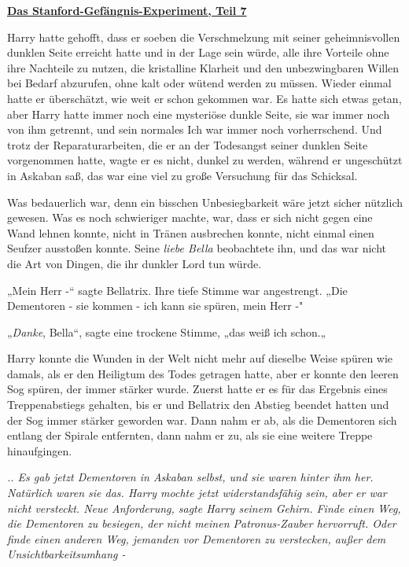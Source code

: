 

\hypertarget{das-stanford-gefuxe4ngnis-experiment-teil-7}{%

\textbf{\uline{Das Stanford-Gefängnis-Experiment, Teil 7}}

\hfill\break Harry hatte gehofft, dass er soeben die Verschmelzung mit seiner geheimnisvollen dunklen Seite erreicht hatte und in der Lage sein würde, alle ihre Vorteile ohne ihre Nachteile zu nutzen, die kristalline Klarheit und den unbezwingbaren Willen bei Bedarf abzurufen, ohne kalt oder wütend werden zu müssen. Wieder einmal hatte er überschätzt, wie weit er schon gekommen war. Es hatte sich etwas getan, aber Harry hatte immer noch eine mysteriöse dunkle Seite, sie war immer noch von ihm getrennt, und sein normales Ich war immer noch vorherrschend. Und trotz der Reparaturarbeiten, die er an der Todesangst seiner dunklen Seite vorgenommen hatte, wagte er es nicht, dunkel zu werden, während er ungeschützt in Askaban saß, das war eine viel zu große Versuchung für das Schicksal.

Was bedauerlich war, denn ein bisschen Unbesiegbarkeit wäre jetzt sicher nützlich gewesen. Was es noch schwieriger machte, war, dass er sich nicht gegen eine Wand lehnen konnte, nicht in Tränen ausbrechen konnte, nicht einmal einen Seufzer ausstoßen konnte. Seine \emph{liebe Bella} beobachtete ihn, und das war nicht die Art von Dingen, die ihr dunkler Lord tun würde.

„Mein Herr -“ sagte Bellatrix. Ihre tiefe Stimme war angestrengt. „Die Dementoren - sie kommen - ich kann sie spüren, mein Herr -"

„\emph{Danke}, Bella“, sagte eine trockene Stimme, „das weiß ich schon.„

Harry konnte die Wunden in der Welt nicht mehr auf dieselbe Weise spüren wie damals, als er den Heiligtum des Todes getragen hatte, aber er konnte den leeren Sog spüren, der immer stärker wurde. Zuerst hatte er es für das Ergebnis eines Treppenabstiegs gehalten, bis er und Bellatrix den Abstieg beendet hatten und der Sog immer stärker geworden war. Dann nahm er ab, als die Dementoren sich entlang der Spirale entfernten, dann nahm er zu, als sie eine weitere Treppe hinaufgingen.

\emph{.. Es gab jetzt Dementoren in Askaban selbst, und sie waren hinter ihm her. Natürlich waren sie das. Harry mochte jetzt widerstandsfähig sein, aber er war nicht versteckt. Neue Anforderung, sagte Harry seinem Gehirn. Finde einen Weg, die Dementoren zu besiegen, der nicht meinen Patronus-Zauber hervorruft. Oder finde einen anderen Weg, jemanden vor Dementoren zu verstecken, außer dem Unsichtbarkeitsumhang -}

}
